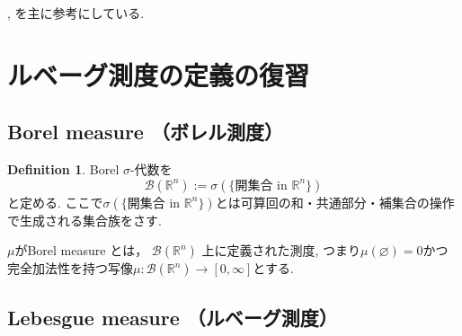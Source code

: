 \documentclass[dvipdfmx,a4paper,11pt]{article} %
\theoremstyle{definition}
\newtheorem{defn}[thm]{Definition}
\theoremstyle{remark}
\numberwithin{equation}{section}
\begin{document}
 \cite[Chapter 1, 3, 6]{Rud}, \cite[Chapter 3]{NO}を主に参考にしている.
 
\section*{ルベーグ測度の定義の復習}
\subsection*{ Borel measure （ボレル測度）}


\begin{tcolorbox}[mybox]
\begin{defn}
Borel \(\sigma\)-代数を
\[
\mathcal{B}(\mathbb{R}^n) := \sigma(\{\text{開集合 in } \mathbb{R}^n\})
\]
と定める. ここで$ \sigma(\{\text{開集合 in } \mathbb{R}^n\})$とは可算回の和・共通部分・補集合の操作で生成される集合族をさす.

$\mu$がBorel measure とは，   \(\mathcal{B}(\mathbb{R}^n)\) 上に定義された測度, つまり$\mu(\varnothing)=0$かつ完全加法性を持つ写像$\mu : \mathcal{B}(\mathbb{R}^n) \to [0, \infty]$とする. 
\end{defn}
\end{tcolorbox}

\subsection*{Lebesgue measure （ルベーグ測度）}
\end{document}
